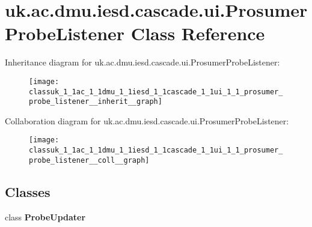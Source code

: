 \hypertarget{classuk_1_1ac_1_1dmu_1_1iesd_1_1cascade_1_1ui_1_1_prosumer_probe_listener}{\section{uk.\-ac.\-dmu.\-iesd.\-cascade.\-ui.\-Prosumer\-Probe\-Listener Class Reference}
\label{classuk_1_1ac_1_1dmu_1_1iesd_1_1cascade_1_1ui_1_1_prosumer_probe_listener}
}


Inheritance diagram for uk.\-ac.\-dmu.\-iesd.\-cascade.\-ui.\-Prosumer\-Probe\-Listener\-:\nopagebreak
\begin{figure}[H]
\begin{center}
\leavevmode
\texttt{[image: classuk\_1\_1ac\_1\_1dmu\_1\_1iesd\_1\_1cascade\_1\_1ui\_1\_1\_prosumer\_probe\_listener\_\_inherit\_\_graph]}
\end{center}
\end{figure}


Collaboration diagram for uk.\-ac.\-dmu.\-iesd.\-cascade.\-ui.\-Prosumer\-Probe\-Listener\-:\nopagebreak
\begin{figure}[H]
\begin{center}
\leavevmode
\texttt{[image: classuk\_1\_1ac\_1\_1dmu\_1\_1iesd\_1\_1cascade\_1\_1ui\_1\_1\_prosumer\_probe\_listener\_\_coll\_\_graph]}
\end{center}
\end{figure}
\subsection*{Classes}
\begin{DoxyCompactItemize}
\item 
class {\bfseries Probe\-Updater}
\end{DoxyCompactItemize}

